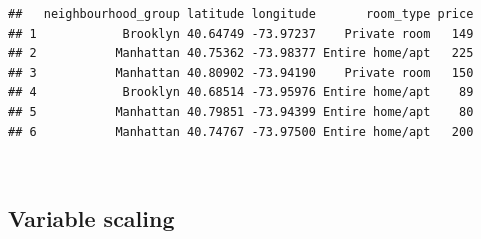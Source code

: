 \documentclass[
]{article}
\begin{document}
\begin{verbatim}
##   neighbourhood_group latitude longitude       room_type price
## 1            Brooklyn 40.64749 -73.97237    Private room   149
## 2           Manhattan 40.75362 -73.98377 Entire home/apt   225
## 3           Manhattan 40.80902 -73.94190    Private room   150
## 4            Brooklyn 40.68514 -73.95976 Entire home/apt    89
## 5           Manhattan 40.79851 -73.94399 Entire home/apt    80
## 6           Manhattan 40.74767 -73.97500 Entire home/apt   200
\end{verbatim}

~\\

\hypertarget{variable-scaling}{%
\subsection{Variable scaling}\label{variable-scaling}}
\end{document}
